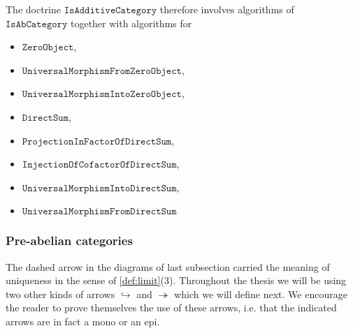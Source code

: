 \begin{doctrine}
The doctrine $\mathtt{IsAdditiveCategory}$ therefore involves algorithms of $\mathtt{IsAbCategory}$ together with algorithms for
\begin{itemize}
 \item $\mathtt{ZeroObject}$,
 \item $\mathtt{UniversalMorphismFromZeroObject}$,
 \item $\mathtt{UniversalMorphismIntoZeroObject}$,
 \item $\mathtt{DirectSum}$,
 \item $\mathtt{ProjectionInFactorOfDirectSum}$,
 \item $\mathtt{InjectionOfCofactorOfDirectSum}$,
 \item $\mathtt{UniversalMorphismIntoDirectSum}$,
 \item $\mathtt{UniversalMorphismFromDirectSum}$
\end{itemize}
\end{doctrine}

\subsubsection{Pre-abelian categories}

The dashed arrow in the diagrams of last subsection carried the meaning of uniqueness in the sense of \ref{def:limit}(3).
Throughout the thesis we will be using two other kinds of arrows $\hookrightarrow$ and $\twoheadrightarrow$ which we will define next.
We encourage the reader to prove themselves the use of these arrows, i.e. that the indicated arrows are in fact a mono or an epi.

